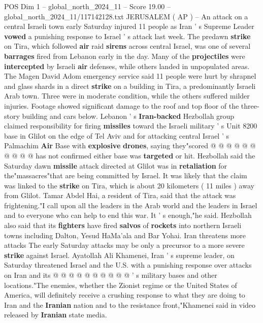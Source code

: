 \begin{textsample}{POS Dim 1 – global\_north\_2024\_11 – Score 19.00 – global\_north\_2024\_11/117142128.txt}  \label{ex:f1_pos_234}
JERUSALEM ( AP ) -- An attack on a central Israeli town early Saturday injured 11 people as Iran ' s Supreme Leader \textbf{vowed} a punishing response to Israel ' s attack last week.
The predawn \textbf{strike} on Tira, which followed \textbf{air} raid \textbf{sirens} across central Israel, was one of several \textbf{barrages} fired from Lebanon early in the day.
Many of the \textbf{projectiles} were \textbf{intercepted} by Israeli \textbf{air} defenses, while others landed in unpopulated areas.
The Magen David Adom emergency service said 11 people were hurt by shrapnel and glass shards in a direct \textbf{strike} on a building in Tira, a predominantly Israeli Arab town.
Three were in moderate condition, while the others suffered milder injuries.
Footage showed significant damage to the roof and top floor of the three-story building and cars below.
Lebanon ' s \textbf{Iran-backed} Hezbollah group claimed responsibility for firing \textbf{missiles} toward the Israeli military ' s Unit 8200 base in Glilot on the edge of Tel Aviv and for attacking central Israel ' s Palmachim \textbf{Air} Base with \textbf{explosive} \textbf{drones}, saying they"scored @ @ @ @ @ @ @ @ @ @ has not confirmed either base was \textbf{targeted} or hit.
Hezbollah said the Saturday dawn \textbf{missile} attack directed at Glilot was in \textbf{retaliation} for the"massacres"that are being committed by Israel.
It was likely that the claim was linked to the \textbf{strike} on Tira, which is about 20 kilometers ( 11 miles ) away from Glilot.
Tamar Abdel Hai, a resident of Tira, said that the attack was frightening."I call upon all the leaders in the Arab world and the leaders in Israel and to everyone who can help to end this war.
It ' s enough,"he said.
Hezbollah also said that its \textbf{fighters} have fired \textbf{salvos} of \textbf{rockets} into northern Israeli towns including Dalton, Yesud HaMa'ala and Bar Yohai.
Iran threatens more attacks The early Saturday attacks may be only a precursor to a more severe \textbf{strike} against Israel.
Ayatollah Ali Khamenei, Iran ' s supreme leader, on Saturday threatened Israel and the U.S. with a punishing response over attacks on Iran and its @ @ @ @ @ @ @ @ @ @ ' s military bases and other locations."The enemies, whether the Zionist regime or the United States of America, will definitely receive a crushing response to what they are doing to Iran and the \textbf{Iranian} nation and to the resistance front,"Khamenei said in video released by \textbf{Iranian} state media.

\end{textsample}
